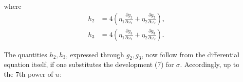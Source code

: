 
where
\[
\begin{aligned}
h_2 &= 4\left(\eta_1\frac{\partial g_2}{\partial \omega_1} + \eta_2\frac{\partial g_2}{\partial \omega_2}\right), \\
h_3 &= 4\left(\eta_1\frac{\partial g_3}{\partial \omega_1} + \eta_2\frac{\partial g_3}{\partial \omega_2}\right).
\end{aligned}
\]

The quantities $h_2, h_3$, expressed through $g_2, g_3$, now follow
from the differential equation itself, if one substitutes the development
(7) for $\sigma$. Accordingly, up to the 7th power of $u$:
